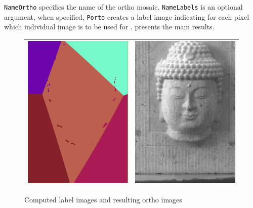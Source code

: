 {\tt NameOrtho} specifies the name of the ortho mosaic. {\tt NameLabels} is an optional
argument, when specified, {\tt Porto} creates a label image indicating for each pixel which 
individual  image is to be used for .   %
presents the main results.


\begin{figure}
\begin{tabular}{||c|c||}
   \hline \hline
   \includegraphics[width=80mm]{FIGS/Boudhas/Label-Test-Redr.jpg}   &
   \includegraphics[width=80mm]{FIGS/Boudhas/Ortho-NonEg-Test-Redr.jpg}   \\ \hline  \hline
\end{tabular}
\label{Resul:Ortho}
\caption{Computed label images and resulting ortho images}
\end{figure}



